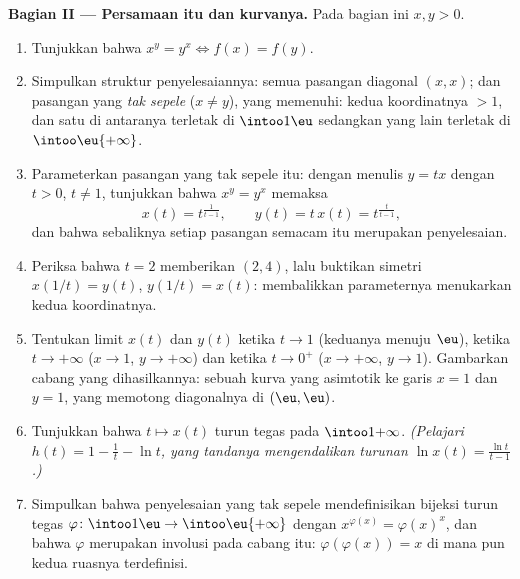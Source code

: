 \begin{problem}
\medskip
\noindent\textbf{Bagian II --- Persamaan itu dan kurvanya.} Pada bagian
ini $x, y > 0$.
\begin{enumerate}[resume]
  \item Tunjukkan bahwa $x^y = y^x \iff f(x) = f(y)$.
  \item Simpulkan struktur  penyelesaiannya: semua pasangan
        diagonal $(x, x)$; dan pasangan yang \emph{tak sepele} ($x \neq
        y$), yang memenuhi: kedua koordinatnya $> 1$, dan satu di antaranya
        terletak di $\intoo1\eu$ sedangkan yang lain terletak di
        $\intoo\eu{+\infty}$.
  \item Parameterkan pasangan yang tak sepele itu: dengan menulis $y = tx$ dengan $t
        > 0$, $t \neq 1$, tunjukkan bahwa $x^y = y^x$ memaksa
        \[
        x(t) = t^{\frac1{t-1}},
        \qquad
        y(t) = t\,x(t) = t^{\frac{t}{t-1}},
        \]
        dan bahwa sebaliknya setiap pasangan semacam itu merupakan penyelesaian.
  \item Periksa bahwa $t = 2$ memberikan $(2, 4)$, lalu buktikan simetri
        $x(1/t) = y(t)$, $y(1/t) = x(t)$: membalikkan parameternya
        menukarkan kedua koordinatnya.
  \item Tentukan limit $x(t)$ dan $y(t)$ ketika $t \to 1$
        (keduanya menuju $\eu$), ketika $t \to +\infty$ ($x \to 1$, $y
        \to +\infty$) dan ketika $t \to 0^+$ ($x \to +\infty$, $y \to
        1$). Gambarkan cabang yang dihasilkannya: sebuah kurva yang asimtotik ke
        garis $x = 1$ dan $y = 1$, yang memotong diagonalnya di
        $(\eu, \eu)$.
  \item Tunjukkan bahwa $t \mapsto x(t)$ turun tegas pada
        $\intoo1{+\infty}$. \emph{(Pelajari $h(t) = 1 - \frac1t - \ln
        t$, yang tandanya mengendalikan turunan $\ln x(t) =
        \frac{\ln t}{t - 1}$.)}
  \item Simpulkan bahwa penyelesaian yang tak sepele mendefinisikan bijeksi
        turun tegas $\varphi \colon \intoo1\eu \to
        \intoo\eu{+\infty}$ dengan $x^{\varphi(x)} = \varphi(x)^x$,
        dan bahwa $\varphi$ merupakan involusi pada cabang itu:
        $\varphi(\varphi(x)) = x$ di mana pun kedua ruasnya terdefinisi.
\end{enumerate}


\end{problem}
